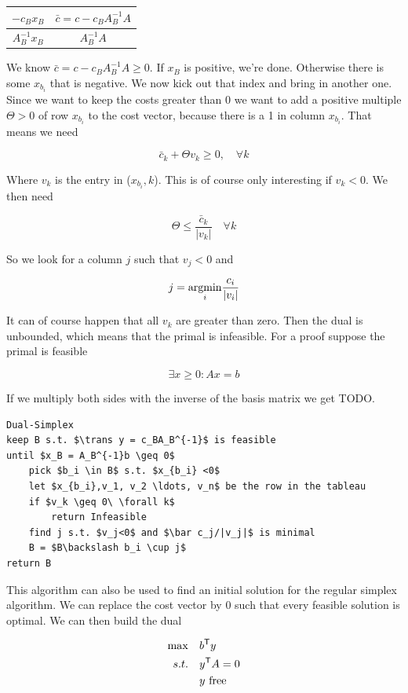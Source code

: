 \begin{center}
\begin{tabular}{c|c}
$-c_Bx_B$ & $\bar c = c-c_BA_B^{-1}A$\\\hline
$A_B^{-1}x_B$ & $A_B^{-1}A$ %
\end{tabular}
\end{center}

We know $\bar c = c-c_BA_B^{-1}A \geq 0$. If $x_B$ is positive, we're done. Otherwise there is some $x_{b_i}$ that is negative. We now kick out that index and bring in another one. Since we want to keep the costs greater than 0 we want to add a positive multiple $\Theta > 0$ of row $x_{b_i}$ to the cost vector, because there is a 1 in column $x_{b_i}$. That means we need

\[\bar c_k + \Theta v_k \geq 0,\quad \forall k\]

Where $v_k$ is the entry in ($x_{b_i}, k$). This is of course only interesting if $v_k<0$. We then need 

\[ \Theta \leq \frac{\bar c_k}{|v_k|} \quad \forall k\]

So we look for a column $j$ such that $v_j<0$ and 

\[j = \underset{i}{\operatorname{argmin}} \frac{c_i}{|v_i|}\]

It can of course happen that all $v_k$ are greater than zero. Then the dual is unbounded, which means that the primal is infeasible. For a proof suppose the primal is feasible

\[\exists x\geq 0: Ax=b\]

If we multiply both sides with the inverse of the basis matrix we get TODO.

\begin{lstlisting}
Dual-Simplex
keep B s.t. $\trans y = c_BA_B^{-1}$ is feasible
until $x_B = A_B^{-1}b \geq 0$
	pick $b_i \in B$ s.t. $x_{b_i} <0$
	let $x_{b_i},v_1, v_2 \ldots, v_n$ be the row in the tableau
	if $v_k \geq 0\ \forall k$
		return Infeasible
	find j s.t. $v_j<0$ and $\bar c_j/|v_j|$ is minimal
	B = $B\backslash b_i \cup j$
return B
\end{lstlisting}

This algorithm can also be used to find an initial solution for the regular simplex algorithm. We can replace the cost vector by $0$ such that every feasible solution is optimal. We can then build the dual

\begin{align*}
\max \quad & {b}^\text{\upshape \sffamily T} y\\
s.t.\quad & {y}^\text{\upshape \sffamily T} A = 0\\
&y \text{ free}
\end{align*}